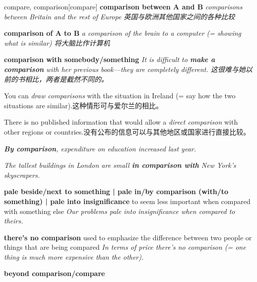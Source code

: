 \begin{DefWord}{compare, comparison}[compare]
    \textbf{comparison between A and B} \textit{comparisons between Britain and the rest of Europe 英国与欧洲其他国家之间的各种比较}

    \textbf{comparison of A to B} \textit{a comparison of the brain to a computer (= showing what is similar) 将大脑比作计算机}
 
    \textbf{comparison with somebody/something} \textit{It is difficult to \textbf{make a comparison} with her previous book—they are completely different. 这很难与她以前的书相比，两者是截然不同的。}

    You can \textit{draw comparisons} with the situation in Ireland (= say how the two situations are similar).这种情形可与爱尔兰的相比。

    There is no published information that would allow a \textit{direct comparison} with other regions or countries.没有公布的信息可以与其他地区或国家进行直接比较。

    \textit{\textbf{By comparison}, expenditure on education increased last year.}

    \textit{The tallest buildings in London are small \textbf{in comparison with} New York's skyscrapers.}

    \textbf{pale beside/next to something | pale in/by comparison (with/to something) | pale into insignificance}   
    to seem less important when compared with something else
    \textit{Our problems pale into insignificance when compared to theirs.}

    \textbf{there's no comparison} 
    used to emphasize the difference between two people or things that are being compared
    \textit{In terms of price there's no comparison (= one thing is much more expensive than the other).}

    \textbf{beyond comparison/compare}
\end{DefWord}

